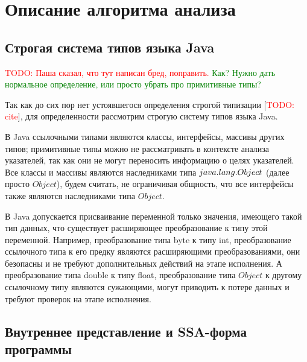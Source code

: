 \documentclass[14pt,titlepage]{extarticle}
\newcommand{\remark}[1]{\textcolor{Green}{#1}}
\newcommand{\todo}[1]{\textcolor{red}{\eng{TODO}: #1}}
\newcommand{\todocite}{[\todo{cite}]}
\newcommand{\eng}[1]{{\English#1}}
\let\oldsection\section
\renewcommand{\section}{\newpage\oldsection}
\begin{document}
  \section{Описание алгоритма анализа}
    \label{section:algorithm}

    \subsection{Строгая система типов языка Java}
      \label{section:type_system}

      \todo{Паша сказал, что тут написан бред, поправить.}
      \remark{Как? Нужно дать нормальное определение, или просто убрать
      про примитивные типы?}

      Так как до сих пор нет устоявшегося определения строгой типизации
      \todocite, для определенности рассмотрим строгую систему типов языка
      Java.

      В Java ссылочными типами являются классы, интерфейсы, массивы других
      типов; примитивные типы можно не рассматривать в контексте анализа
      указателей, так как они не могут переносить информацию о целях
      указателей. Все классы и массивы являются наследниками типа
      $java\-.lang\-.Object$ (далее просто $Object$), будем считать,
      не ограничивая общность, что все интерфейсы также являются
      наследниками типа $Object$.

      В Java допускается присваивание переменной только значения, имеющего
      такой тип данных, что существует расширяющее преобразование к типу этой
      переменной.
      Например, преобразование типа byte к типу int, преобразование ссылочного
      типа к его предку являются расширяющими преобразованиями, они безопасны и
      не требуют дополнительных действий на этапе исполнения.
      А преобразование типа double к типу float, преобразование типа $Object$ к
      другому ссылочному типу являются сужающими, могут приводить к потере
      данных и требуют проверок на этапе исполнения.

    \subsection{Внутреннее представление и SSA-форма программы}
      \label{section:ir_and_ssa}
\end{document}
